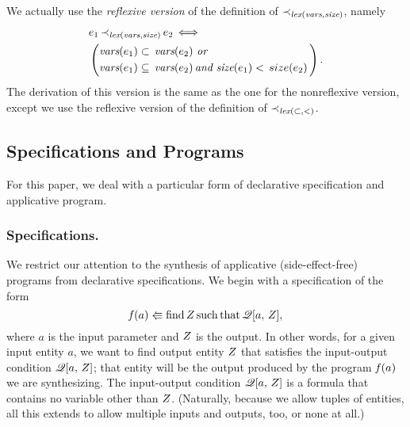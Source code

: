 \documentclass[runningheads]{llncs}
\DeclareMathOperator{\uand}{\emph{and}\,}
\DeclareMathOperator{\uor}{\emph{or}\,}
\DeclareMathOperator{\uf}{\emph{f}\,}
\DeclareMathOperator{\uiff}{\iff}
\DeclareMathOperator{\lex}{\emph{lex}}
\begin{document}
We actually  use the \emph{reflexive version} of the definition of $\expsub{\prec}{\lex(\vars,\size)}$, namely
  \begin{alignat*}{2}
  \begin{split}
  &\e{1} \, \expsub{\prec}{\lex(\vars,\size)}\, \e{2}
  \uiff \\
  &\left(\begin{aligned}
  &\vars(\e{1}) \subset \, \vars(\e{2})\, \uor \, \\
  &\vars(\e{1}) \subseteq \, \vars(\e{2}) \uand
 \size(\e{1}) < \, size(\e{2})\,
  \end{aligned}\right).
  \end{split}
  \end{alignat*}
 The derivation of this version is the same as the one for the nonreflexive version, except we use the reflexive version of the definition of $\expsub{\prec}{\lex(\subset, <)}$.


  
   
   \subsection{Specifications and Programs} 
   For this paper, we deal with a particular form of declarative specification and applicative program.
  
   
   \subsubsection{Specifications.}  We restrict our attention to the synthesis of applicative (side-effect-free) programs from declarative specifications.  We begin with a specification of the form 
  \begin{equation*} \uf(a) \Lleftarrow \operatorname{find} \var{Z} \operatorname{such} \operatorname{that} \mathscr{Q}[a, \, \var{Z}],
  \end{equation*}
  where $a$ is the input parameter and $Z$ is the output.  In other words, for a given input entity $a$, we want to find output entity $Z$ that satisfies the input-output condition $\mathscr{Q}[a, \, Z]$; that entity will be the output produced by the program $\uf(a)$ we are synthesizing.   The input-output condition $\mathscr{Q}[a, \, Z]$ is a formula that contains no variable other than $Z$. (Naturally, because we allow tuples of entities, all this extends to allow multiple inputs and outputs, too, or none at all.)
\end{document}
